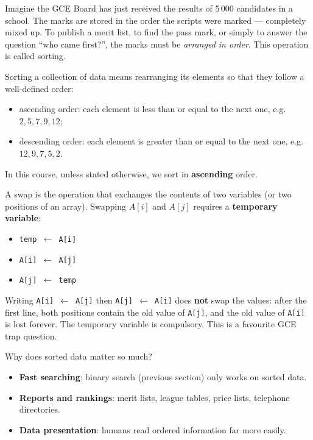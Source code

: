 \documentclass[11pt]{article}
\newcommand{\cle}[1]{{\popxbold\color{popdark}#1}}
\newcounter{popsec}
\newcounter{popsub}
\newcommand{\courssub}[1]{%
  \stepcounter{popsub}%
  \par\vspace{9pt}\noindent{\popxbold\fontsize{11.5}{13}\selectfont\color{popink}{\color{poporange}\thepopsec.\thepopsub}\hspace{6pt}#1}\par\nopagebreak\vspace{4pt}
}
\begin{document}
\courssub{What is Sorting?}

Imagine the GCE Board has just received the results of 5\,000 candidates in a school. The marks are stored in the order the scripts were marked --- completely mixed up. To publish a merit list, to find the pass mark, or simply to answer the question ``who came first?'', the marks must be \emph{arranged in order}. This operation is called \cle{sorting}.

\begin{definition}
\cle{Sorting} a collection of data means rearranging its elements so that they follow a well-defined order:
\begin{itemize}
\item \cle{ascending order}: each element is less than or equal to the next one, e.g.\ $2, 5, 7, 9, 12$;
\item \cle{descending order}: each element is greater than or equal to the next one, e.g.\ $12, 9, 7, 5, 2$.
\end{itemize}
In this course, unless stated otherwise, we sort in \textbf{ascending} order.
\end{definition}

\begin{definition}
A \cle{swap} is the operation that exchanges the contents of two variables (or two positions of an array). Swapping $A[i]$ and $A[j]$ requires a \textbf{temporary variable}:
\begin{itemize}
\item[] \texttt{temp $\leftarrow$ A[i]}
\item[] \texttt{A[i] $\leftarrow$ A[j]}
\item[] \texttt{A[j] $\leftarrow$ temp}
\end{itemize}
\end{definition}

\begin{attention}
Writing \texttt{A[i] $\leftarrow$ A[j]} then \texttt{A[j] $\leftarrow$ A[i]} does \textbf{not} swap the values: after the first line, both positions contain the old value of \texttt{A[j]}, and the old value of \texttt{A[i]} is lost forever. The temporary variable is compulsory. This is a favourite GCE trap question.
\end{attention}

Why does sorted data matter so much?
\begin{itemize}
\item \textbf{Fast searching}: binary search (previous section) only works on sorted data.
\item \textbf{Reports and rankings}: merit lists, league tables, price lists, telephone directories.
\item \textbf{Data presentation}: humans read ordered information far more easily.
\end{itemize}
\end{document}
